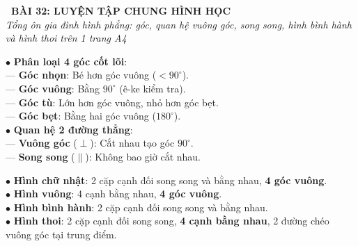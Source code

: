 \documentclass[14pt,a4paper,oneside]{extbook}
\begin{document}
\noindent
\begin{tcolorbox}[
  enhanced,
  colback=teal!8!white,
  colframe=teal!80!black,
  arc=3mm, boxrule=1pt,
  left=3mm, right=3mm, top=2mm, bottom=2mm,
  halign=center
]
  {\Large\bfseries\color{teal!90!black}\faBookmark\ BÀI 32: LUYỆN TẬP CHUNG HÌNH HỌC}\\[1.5pt]
  {\footnotesize\itshape\color{black!75} Tổng ôn gia đình hình phẳng: góc, quan hệ vuông góc, song song, hình bình hành và hình thoi trên 1 trang A4}
\end{tcolorbox}

\vspace{2mm}

\noindent
\begin{minipage}[t]{0.49\textwidth}
  \begin{tcolorbox}[
    enhanced,
    title={\footnotesize\bfseries\color{white}\faListUl\ 1. Bốn loại góc và quan hệ đường thẳng},
    colback=blue!2!white,
    colframe=blue!75!black,
    arc=2.5mm, boxrule=0.8pt, top=1.8mm, bottom=1.8mm, left=2mm, right=2mm
  ]
    \footnotesize
    $\bullet$ \textbf{Phân loại 4 góc cốt lõi}:\\
    --- \textbf{Góc nhọn}: Bé hơn góc vuông ($< 90^\circ$).\\
    --- \textbf{Góc vuông}: Bằng $90^\circ$ (ê-ke kiểm tra).\\
    --- \textbf{Góc tù}: Lớn hơn góc vuông, nhỏ hơn góc bẹt.\\
    --- \textbf{Góc bẹt}: Bằng hai góc vuông ($180^\circ$).\\
    $\bullet$ \textbf{Quan hệ 2 đường thẳng}:\\
    --- \textbf{Vuông góc} ($\perp$): Cắt nhau tạo góc $90^\circ$.\\
    --- \textbf{Song song} ($\parallel$): Không bao giờ cắt nhau.
  \end{tcolorbox}
\end{minipage}%
\hfill
\begin{minipage}[t]{0.49\textwidth}
  \begin{tcolorbox}[
    enhanced,
    title={\footnotesize\bfseries\color{white}\faThLarge\ 2. Bốn tứ giác đặc biệt Lớp 4},
    colback=teal!2!white,
    colframe=teal!75!black,
    arc=2.5mm, boxrule=0.8pt, top=1.8mm, bottom=1.8mm, left=2mm, right=2mm
  ]
    \footnotesize
    $\bullet$ \textbf{Hình chữ nhật}: 2 cặp cạnh đối song song và bằng nhau, \textbf{4 góc vuông}.\\
    $\bullet$ \textbf{Hình vuông}: 4 cạnh bằng nhau, \textbf{4 góc vuông}.\\
    $\bullet$ \textbf{Hình bình hành}: 2 cặp cạnh đối song song và bằng nhau.\\
    $\bullet$ \textbf{Hình thoi}: 2 cặp cạnh đối song song, \textbf{4 cạnh bằng nhau}, 2 đường chéo vuông góc tại trung điểm.
  \end{tcolorbox}
\end{minipage}
\end{document}
